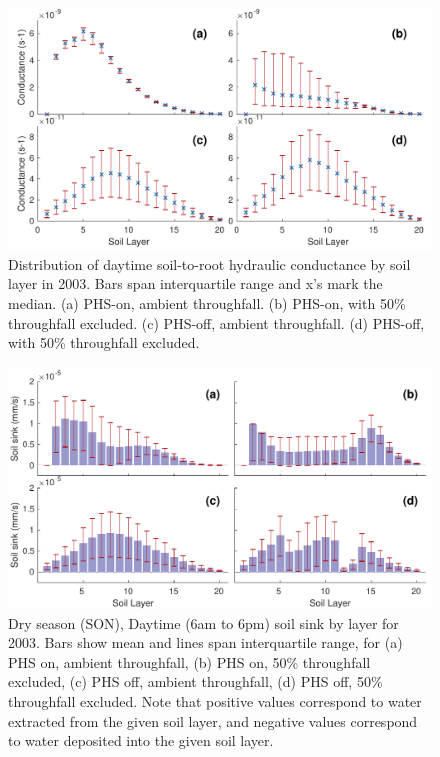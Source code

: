 \documentclass[draft,linenumbers]{agujournal}
\begin{document}
  
\clearpage   
  \begin{figure}[h]
     \centering
     \includegraphics[width=30pc]{../figs/fig6.pdf}
     \caption{Distribution of daytime soil-to-root hydraulic conductance by soil layer in 2003. Bars span interquartile range and x's mark the median. 
     (a) PHS-on, ambient throughfall.
     (b) PHS-on, with 50\% throughfall excluded.
     (c) PHS-off, ambient throughfall.
     (d) PHS-off, with 50\% throughfall excluded.
     }
     \label{fig6}
  \end{figure}

  
        \clearpage
    \begin{figure}[h]
     \centering
     \includegraphics[width=30pc]{../figs/fig7.pdf}
     \caption{Dry season (SON), Daytime (6am to 6pm) soil sink by layer for 2003. 
     Bars show mean and lines span interquartile range, for 
     (a) PHS on, ambient throughfall,
     (b) PHS on, 50\% throughfall excluded,
     (c) PHS off, ambient throughfall,
     (d) PHS off, 50\% throughfall excluded. 
     Note that positive values correspond to water extracted from the given soil layer, 
     and negative values correspond to water deposited into the given soil layer.}
     \label{fig7}
  \end{figure}
  
\end{document}
